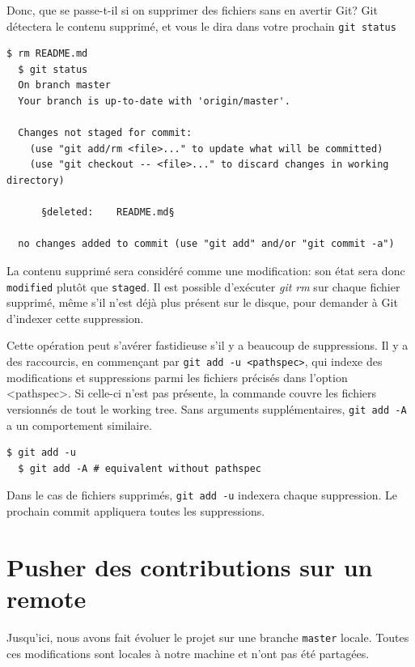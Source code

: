 \documentclass{../../common/tufte-latex/tufte-handout}
\begin{document}
Donc, que se passe-t-il si on supprimer des fichiers sans en avertir Git?
Git détectera le contenu supprimé, et vous le dira dans votre prochain \texttt{git status}

\begin{lstlisting}[style=BashInputStyle]
  $ rm README.md
  $ git status
  On branch master
  Your branch is up-to-date with 'origin/master'.

  Changes not staged for commit:
    (use "git add/rm <file>..." to update what will be committed)
    (use "git checkout -- <file>..." to discard changes in working directory)

      §deleted:    README.md§

  no changes added to commit (use "git add" and/or "git commit -a")
\end{lstlisting}

La contenu supprimé sera considéré comme une modification: son état sera donc \texttt{modified} plutôt que \texttt{staged}.
Il est possible d'exécuter \textit{git rm} sur chaque fichier supprimé, même s'il n'est déjà plus présent sur le disque, pour demander à Git d'indexer cette suppression.

Cette opération peut s'avérer fastidieuse s'il y a beaucoup de suppressions.
Il y a des raccourcis, en commençant par \texttt{git add -u <pathspec>}, qui indexe des modifications et suppressions parmi les fichiers précisés dans l'option <pathspec>. 
Si celle-ci n'est pas présente, la commande couvre les fichiers versionnés de tout le working tree. Sans arguments supplémentaires, \texttt{git add -A} a un comportement similaire.

\begin{lstlisting}[style=BashInputStyle]
  $ git add -u
  $ git add -A # equivalent without pathspec
\end{lstlisting}

Dans le cas de fichiers supprimés, \texttt{git add -u} indexera chaque suppression. Le prochain commit appliquera toutes les suppressions.

\section{Pusher des contributions sur un remote}

Jusqu'ici, nous avons fait évoluer le projet sur une branche \texttt{master} locale.
Toutes ces modifications sont locales à notre machine et n'ont pas été partagées.
\end{document}
